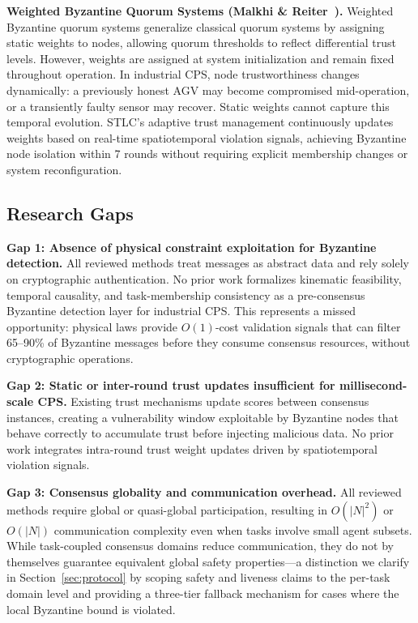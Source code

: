 \documentclass[manuscript,screen,review]{acmart}
\begin{document}
\textbf{Weighted Byzantine Quorum Systems (Malkhi \& Reiter~\cite{malkhi1998byzantine}).} Weighted Byzantine quorum systems generalize classical quorum systems by assigning static weights to nodes, allowing quorum thresholds to reflect differential trust levels. However, weights are assigned at system initialization and remain fixed throughout operation. In industrial CPS, node trustworthiness changes dynamically: a previously honest AGV may become compromised mid-operation, or a transiently faulty sensor may recover. Static weights cannot capture this temporal evolution. STLC's adaptive trust management continuously updates weights based on real-time spatiotemporal violation signals, achieving Byzantine node isolation within 7 rounds without requiring explicit membership changes or system reconfiguration.

\subsection{Research Gaps}

\textbf{Gap 1: Absence of physical constraint exploitation for Byzantine detection.} All reviewed methods treat messages as abstract data and rely solely on cryptographic authentication. No prior work formalizes kinematic feasibility, temporal causality, and task-membership consistency as a pre-consensus Byzantine detection layer for industrial CPS. This represents a missed opportunity: physical laws provide $O(1)$-cost validation signals that can filter 65--90\% of Byzantine messages before they consume consensus resources, without cryptographic operations.

\textbf{Gap 2: Static or inter-round trust updates insufficient for millisecond-scale CPS.} Existing trust mechanisms update scores between consensus instances, creating a vulnerability window exploitable by Byzantine nodes that behave correctly to accumulate trust before injecting malicious data. No prior work integrates intra-round trust weight updates driven by spatiotemporal violation signals.

\textbf{Gap 3: Consensus globality and communication overhead.} All reviewed methods require global or quasi-global participation, resulting in $O(|N|^2)$ or $O(|N|)$ communication complexity even when tasks involve small agent subsets. While task-coupled consensus domains reduce communication, they do not by themselves guarantee equivalent global safety properties---a distinction we clarify in Section~\ref{sec:protocol} by scoping safety and liveness claims to the per-task domain level and providing a three-tier fallback mechanism for cases where the local Byzantine bound is violated.
\end{document}
